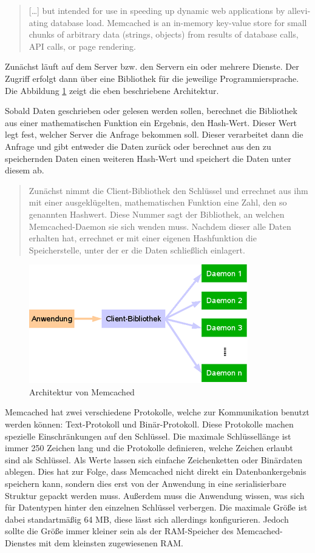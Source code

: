 \foreignblockquote{english}[\cite{Memcached2017}]{[\dots{}] but intended for
use in speeding up dynamic web applications by alleviating database load.
Memcached is an in-memory key-value store for small chunks of arbitrary
data (strings, objects) from results of database calls, API calls, or page
rendering.}

Zunächst läuft auf dem Server bzw. den Servern ein oder mehrere Dienste. Der
Zugriff erfolgt dann über eine Bibliothek für die jeweilige Programmiersprache.
Die Abbildung \ref{fig:memcached-architecture} zeigt die eben beschriebene
Architektur.

Sobald Daten geschrieben oder gelesen werden sollen, berechnet die Bibliothek
aus einer mathematischen Funktion ein Ergebnis, den Hash-Wert. Dieser Wert legt
fest, welcher Server die Anfrage bekommen soll. Dieser verarbeitet dann die
Anfrage und gibt entweder die Daten zurück oder berechnet aus den zu
speichernden Daten einen weiteren Hash-Wert und speichert die Daten unter
diesem ab.

\blockquote[\cite{Schuermann2009}]{Zunächst nimmt die Client-Bibliothek den
Schlüssel und errechnet aus ihm mit einer ausgeklügelten, mathematischen
Funktion eine Zahl, den so genannten Hashwert. Diese Nummer sagt der Bibliothek,
an welchen Memcached-Daemon sie sich wenden muss. Nachdem dieser alle Daten
erhalten hat, errechnet er mit einer eigenen Hashfunktion die Speicherstelle,
unter der er die Daten schließlich einlagert.}

\begin{figure}
\centering
\includegraphics{images/memcached_illustration_large.png}
\caption{Architektur von Memcached \cite{Schuermann2009}}
\label{fig:memcached-architecture}
\end{figure}

Memcached hat zwei verschiedene Protokolle, welche zur Kommunikation benutzt
werden können: Text-Protokoll und Binär-Protokoll. Diese Protokolle machen
spezielle Einschränkungen auf den Schlüssel. Die maximale Schlüssellänge ist
immer 250 Zeichen lang und die Protokolle definieren, welche Zeichen erlaubt
sind als Schlüssel. Als Werte lassen sich einfache Zeichenketten oder
Binärdaten ablegen. Dies hat zur Folge, dass Memcached nicht direkt ein
Datenbankergebnis speichern kann, sondern dies erst von der Anwendung in eine
serialisierbare Struktur gepackt werden muss. Außerdem muss die Anwendung
wissen, was sich für Datentypen hinter den einzelnen Schlüssel verbergen.
Die maximale Größe ist dabei standartmäßig 64 MB, diese lässt sich allerdings
konfigurieren. Jedoch sollte die Größe immer kleiner sein als
der \gls{RAM}-Speicher des Memcached-Dienstes mit dem kleinsten
zugewiesenen \gls{RAM}.

